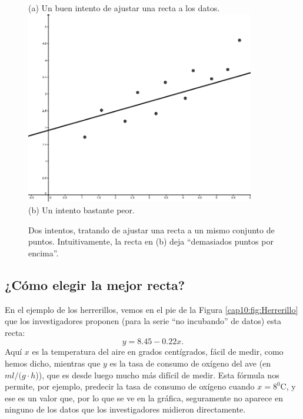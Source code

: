 \begin{figure}[htbp]
\begin{center}
\begin{bn}
(a) Un buen intento de ajustar una recta a los datos.\\
\includegraphics[width=10cm]{../fig/Cap10-RectaRegresionMalIntento-bn.png}\\
(b) Un intento bastante peor.
\end{bn}
\caption{Dos intentos, tratando de ajustar una recta a un mismo conjunto de puntos. Intuitivamente, la recta en (b) deja ``demasiados puntos por encima''.}
\label{cap10:fig:AjusteRectaPuntos}
\end{center}
\end{figure}

\subsection{¿Cómo elegir la mejor recta?}
\label{cap10:subsec:ComoElegirLaMejorRecta}

En el ejemplo de los herrerillos, vemos en el pie de la Figura \ref{cap10:fig:Herrerillo} que los investigadores proponen (para la serie ``no incubando'' de datos) esta recta:
\[y=8.45-0.22x.\]
Aquí $x$ es la temperatura del aire en grados centígrados, fácil de medir, como hemos dicho, mientras que $y$ es la tasa de consumo de oxígeno del ave (en $ml/(g\cdot h$)), que es desde luego mucho más difícil de medir. Esta fórmula nos permite, por ejemplo, predecir la tasa de consumo de oxígeno cuando $x=8^0$C, y ese es un valor que, por lo que se ve en la gráfica, seguramente no aparece en ninguno de los datos que los investigadores midieron directamente.

